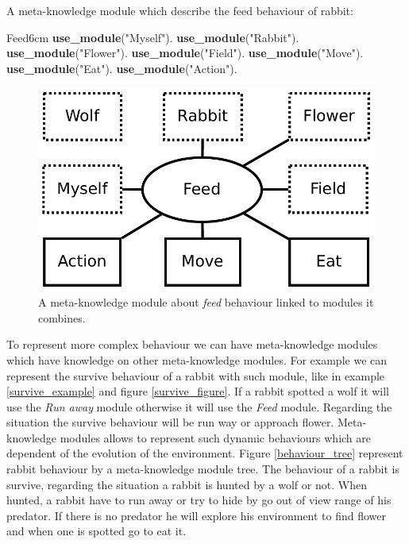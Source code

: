 \documentclass{aamas2012}
\begin{document}
	\begin{example}
		\label{feed_example}
		A meta-knowledge module which describe the feed behaviour of rabbit:\newline
		\begin{module}{Feed}{6cm}
			\textbf{use\_module}("Myself").\newline
			\textbf{use\_module}("Rabbit").\newline
			\textbf{use\_module}("Flower").\newline
			\textbf{use\_module}("Field").\newline
			\textbf{use\_module}("Move").\newline
			\textbf{use\_module}("Eat").\newline
			\textbf{use\_module}("Action").
		\end{module}
	\end{example}
	
	\begin{figure}
		\centering
		\includegraphics[keepaspectratio=true, scale=0.4]{feed.pdf}
		\caption
		{
			\label{feed_figure}
			A meta-knowledge module about \textit{feed} behaviour linked to modules it combines.
		}
	\end{figure}
	
	To represent more complex behaviour we can have meta-knowledge modules which have knowledge on other meta-knowledge modules.
	For example we can represent the survive behaviour of a rabbit with such module, like in example \ref{survive_example} and figure \ref{survive_figure}.
	If a rabbit spotted a wolf it will use the \emph{Run away} module otherwise it will use the \emph{Feed} module.
	Regarding the situation the survive behaviour will be run way or approach flower.
	Meta-knowledge modules allows to represent such dynamic behaviours which are dependent of the evolution of the environment.
	Figure \ref{behaviour_tree} represent rabbit behaviour by a meta-knowledge module tree.
	The behaviour of a rabbit is survive, regarding the situation a rabbit is hunted by a wolf or not.
	When hunted, a rabbit have to run away or try to hide by go out of view range of his predator.
	If there is no predator he will explore his environment to find flower and when one is spotted go to eat it.
	
\end{document}
